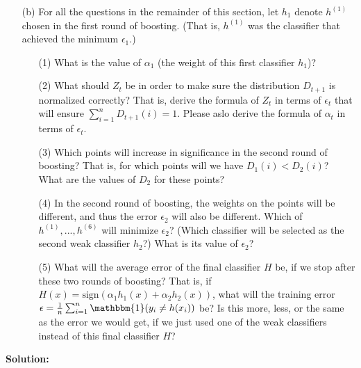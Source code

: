 \documentclass[10pt]{article}
\begin{document}
\begin{enumerate}[1.]
\begin{itemize}
	        \item[(b)] For all the questions in the remainder of this section, let $h_{1}$ denote $h^{(1)}$ chosen in the first round of boosting. (That is, $h^{(1)}$ was the classifier that achieved the minimum $\epsilon_{1}$.)
		        \begin{enumerate}
			        \item[(1)] What is the value of $\alpha_{1}$ (the weight of this first classifier $h_{1}$)? ~\\

			        \item[(2)] What should $Z_{t}$ be in order to make sure the distribution $D_{t+1}$ is normalized correctly? That is, derive the formula of $Z_{t}$ in terms of $\epsilon_{t}$ that will ensure $\sum_{i=1}^{n} D_{t+1}(i) = 1$. Please aslo derive the formula of $\alpha_{t}$ in terms of $\epsilon_{t}$. ~\\

			        \item[(3)] Which points will increase in significance in the second round of boosting? That is, for which points will we have $D_{1}(i) < D_{2}(i)$? What are the values of $D_{2}$ for these points?~\\

			        \item[(4)] In the second round of boosting, the weights on the points will be different, and thus the error $\epsilon_2$ will also be different. Which of $h^{(1)}, . . . , h^{(6)}$ will minimize $\epsilon_2$? (Which classifier will be selected as the second weak classifier $h_2$?) What is its value of $\epsilon_2$?~\\

			        \item[(5)] What will the average error of the final classifier $H$ be, if we stop after these two rounds of boosting? That is, if $H(x) = \text{sign}(\alpha_{1}h_{1}(x) + \alpha_{2}h_{2}(x))$, what will the  training error $\epsilon = \frac{1}{n} \sum_{i=1}^{n} \mathbbm{1} (y_{i} \neq h(x_{i}))$ be? Is this more, less, or the same as the error we would get, if we just used one of the weak classifiers instead of this final classifier $H$?~\\

		        \end{enumerate}
        \end{itemize}
		\textbf{Solution:}
        \newpage


\end{enumerate}
\end{document}
